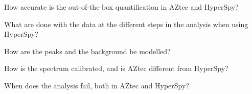\begin{subprob} \label{subproblem1}
    How accurate is the out-of-the-box quantification in AZtec and HyperSpy?
\end{subprob}
\begin{subprob} \label{subproblem2}
    What are done with the data at the different steps in the analysis when using HyperSpy?
\end{subprob}
\begin{subprob} \label{subproblem3}
    How are the peaks and the background be modelled?
\end{subprob}
\begin{subprob} \label{subproblem4}
    How is the spectrum calibrated, and is AZtec different from HyperSpy?
\end{subprob}
\begin{subprob} \label{subproblem6}
    When does the analysis fail, both in AZtec and HyperSpy?
\end{subprob}



%
%



